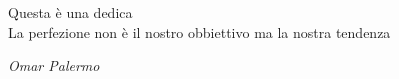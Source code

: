 \cleardoublepage
    \thispagestyle{empty}
            \begin{flushright}
				Questa è una dedica
				\\
				\vspace{1em}
				La perfezione non è il nostro obbiettivo
				ma la nostra tendenza

				\textit{Omar Palermo}

            \end{flushright}
\cleardoublepage